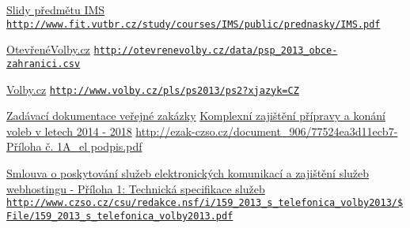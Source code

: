 \documentclass[12pt,a4paper,titlepage,final]{article}
\begin{document}
\begin{thebibliography}{1}

\href{http://www.fit.vutbr.cz/study/courses/IMS/public/prednasky/IMS.pdf}{Slidy předmětu IMS} \newline
\href{http://www.fit.vutbr.cz/study/courses/IMS/public/prednasky/IMS.pdf}{\nolinkurl{http://www.fit.vutbr.cz/study/courses/IMS/public/prednasky/IMS.pdf}}

\href{http://otevrenevolby.cz/data/psp_2013_obce-zahranici.csv}{OtevřenéVolby.cz} \newline
\href{http://otevrenevolby.cz/data/psp_2013_obce-zahranici.csv}{\nolinkurl{http://otevrenevolby.cz/data/psp_2013_obce-zahranici.csv}}

\href{http://www.volby.cz/pls/ps2013/ps2?xjazyk=CZ}{Volby.cz} \newline
\href{http://www.volby.cz/pls/ps2013/ps2?xjazyk=CZ}{\nolinkurl{http://www.volby.cz/pls/ps2013/ps2?xjazyk=CZ}}

\href{http://ezak-czso.cz/document_906/77524ea3d11ecb7-Příloha č. 1A_el podpis.pdf}{Zadávací dokumentace veřejné zakázky} \newline
\href{http://ezak-czso.cz/document_906/77524ea3d11ecb7-Příloha č. 1A_el podpis.pdf}{Komplexní zajištění přípravy a konání voleb v letech 2014 - 2018} \newline
\href{http://ezak-czso.cz/document_906/77524ea3d11ecb7-Příloha č. 1A_el podpis.pdf}{http://ezak-czso.cz/document\_906/77524ea3d11ecb7-Příloha č. 1A\_el podpis.pdf}

\href{http://www.czso.cz/csu/redakce.nsf/i/159_2013_s_telefonica_volby2013/$File/159_2013_s_telefonica_volby2013.pdf}{Smlouva o poskytování služeb elektronických komunikací a zajištění služeb} \newline
\href{http://www.czso.cz/csu/redakce.nsf/i/159_2013_s_telefonica_volby2013/$File/159_2013_s_telefonica_volby2013.pdf}{webhostingu - Příloha 1: Technická specifikace služeb} \newline
\href{http://www.czso.cz/csu/redakce.nsf/i/159_2013_s_telefonica_volby2013/$File/159_2013_s_telefonica_volby2013.pdf}{\nolinkurl{http://www.czso.cz/csu/redakce.nsf/i/159_2013_s_telefonica_volby2013/$File/159_2013_s_telefonica_volby2013.pdf}}


\end{thebibliography}
\end{document}
